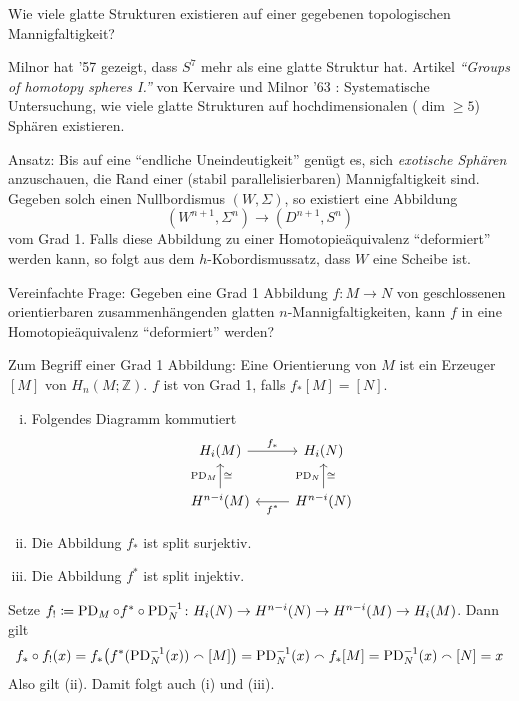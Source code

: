 \begin{frage}
	Wie viele glatte Strukturen existieren auf einer gegebenen topologischen Mannigfaltigkeit?
\end{frage}

Milnor hat '57 gezeigt, dass $S^7$ mehr als eine glatte Struktur hat. 
Artikel \emph{\enquote{Groups of homotopy spheres I.}} von Kervaire und Milnor '63 : Systematische Untersuchung, wie viele glatte Strukturen auf hochdimensionalen ($\dim \ge 5$) Sphären existieren. 

Ansatz: Bis auf eine \enquote{endliche Uneindeutigkeit} genügt es, sich \emph{exotische Sphären} anzuschauen, die Rand einer (stabil parallelisierbaren) Mannigfaltigkeit sind.
Gegeben solch einen Nullbordismus $(W,\Sigma)$, so existiert eine Abbildung 
\[
	(W^{n+1},\Sigma^n) \longrightarrow (D^{n+1},S^n) 
\]
vom Grad 1. 
Falls diese Abbildung zu einer Homotopieäquivalenz \enquote{deformiert} werden kann, so folgt aus dem $h$-Kobordismussatz, dass $W$ eine Scheibe ist.

Vereinfachte Frage: Gegeben eine Grad 1 Abbildung $f \colon M \to N$ von geschlossenen orientierbaren zusammenhängenden glatten $n$-Mannigfaltigkeiten, kann $f$ in eine Homotopieäquivalenz \enquote{deformiert} werden?

\begin{erinnerung}
	Zum Begriff einer Grad 1 Abbildung: Eine Orientierung von $M$ ist ein Erzeuger $[M]$ von $H_n(M;\mathbb{Z})$. 
	$f$ ist von Grad 1, falls $f_*[M]=[N]$.
\end{erinnerung}

\begin{lemma}[label=lem:ex:lem1]
	\begin{enumerate}[(i)]
		\item Folgendes Diagramm kommutiert
		\[
			\begin{tikzcd}
				H_i(M) \rar["f_*"] & H_i(N) \\
				H^{n-i}(M) \uar["\PD_M","\cong"'] & H^{n-i}(N) \lar["f^*"] \uar["\PD_N","\cong"']
			\end{tikzcd}
		\]
		\item Die Abbildung $f_*$ ist split surjektiv.
		\item Die Abbildung $f^*$ ist split injektiv.
	\end{enumerate}
\end{lemma}
\begin{beweis}
	Setze $f_! \coloneqq \PD_M \circ f^* \circ  \PD^{-1}_N \colon H_i(N) \to H^{n-i}(N) \to H^{n-i}(M) \to H_i(M)$.
	Dann gilt 
	\[
		f_* \circ f_!(x) = f_* \enbrace[\big]{f^* (\PD^{-1}_N(x)) \capp [M]} = \PD_N^{-1}(x) \capp f_*[M] = \PD_N^{-1}(x) \capp [N] = x
	\]
	Also gilt (ii).
	Damit folgt auch (i) und (iii).
\end{beweis}

